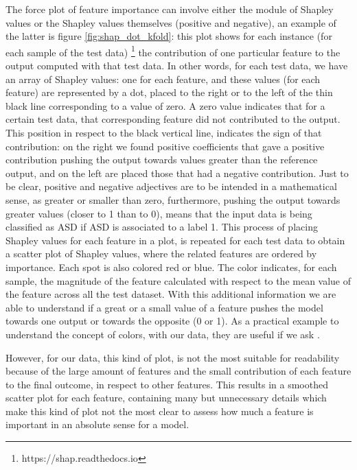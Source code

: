 \documentclass[11pt]{report}
\begin{document}
The force plot of feature importance can involve either the module of Shapley values or the Shapley values themselves (positive and negative), an example of the latter is figure \ref{fig:shap_dot_kfold}: this plot shows for each instance (for each sample of the test data)
\footnote{https://shap.readthedocs.io}
the contribution of one particular feature to the output computed with that test data.
In other words, for each test data, we have an array of Shapley values: one for each feature, and these values (for each feature) are represented by a dot, placed to the right or to the left of the thin black line corresponding to a value of zero. 
A zero value indicates that for a certain test data, that corresponding feature did not contributed to the output.
This position in respect to the black vertical line, indicates the sign of that contribution: on the right we found positive coefficients that gave a positive contribution pushing the output towards values greater than the reference output, and on the left are placed those that had a negative contribution.
Just to be clear, positive and negative adjectives are to be intended in a mathematical sense, as greater or smaller than zero, furthermore, pushing the output towards greater values (closer to 1 than to 0), means that the input data is being classified as ASD if ASD is associated to a label 1.
This process of placing Shapley values for each feature in a plot, is repeated for each test data to obtain a scatter plot of Shapley values, where the related features are ordered by importance.
Each spot is also colored red or blue. 
The color indicates, for each sample, the magnitude of the feature calculated with respect to the mean value of the feature across all the test dataset. 
With this additional information we are able to understand if a great or a small value of a feature pushes the model towards one output or towards the opposite (0 or 1).
As a practical example to understand the concept of colors, with our data, they are useful if we ask .


However, for our data, this kind of plot, is not the most suitable for readability because of the large amount of features and the small contribution of each feature to the final outcome, in respect to other features.
This results in a smoothed scatter plot for each feature, containing many but unnecessary details which make this kind of plot not the most clear to assess how much a feature is important in an absolute sense for a model.
\end{document}
